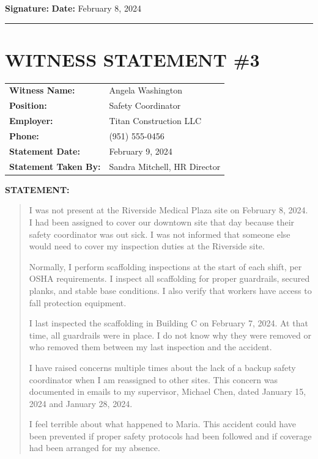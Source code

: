 \documentclass[11pt]{article}
\begin{document}
\vspace{1em}

\noindent\textbf{Signature:} \underline{\hspace{5cm}} \hfill \textbf{Date:} February 8, 2024

\vspace{3em}
\hrule
\vspace{2em}

\section*{WITNESS STATEMENT \#3}

\begin{tabular}{@{}p{4cm}p{10cm}@{}}
\textbf{Witness Name:} & Angela Washington \\
\textbf{Position:} & Safety Coordinator \\
\textbf{Employer:} & Titan Construction LLC \\
\textbf{Phone:} & (951) 555-0456 \\
\textbf{Statement Date:} & February 9, 2024 \\
\textbf{Statement Taken By:} & Sandra Mitchell, HR Director \\
\end{tabular}

\vspace{1em}

\noindent\textbf{STATEMENT:}

\begin{quote}
I was not present at the Riverside Medical Plaza site on February 8, 2024. I had been assigned to cover our downtown site that day because their safety coordinator was out sick. I was not informed that someone else would need to cover my inspection duties at the Riverside site.

Normally, I perform scaffolding inspections at the start of each shift, per OSHA requirements. I inspect all scaffolding for proper guardrails, secured planks, and stable base conditions. I also verify that workers have access to fall protection equipment.

I last inspected the scaffolding in Building C on February 7, 2024. At that time, all guardrails were in place. I do not know why they were removed or who removed them between my last inspection and the accident.

I have raised concerns multiple times about the lack of a backup safety coordinator when I am reassigned to other sites. This concern was documented in emails to my supervisor, Michael Chen, dated January 15, 2024 and January 28, 2024.

I feel terrible about what happened to Maria. This accident could have been prevented if proper safety protocols had been followed and if coverage had been arranged for my absence.
\end{quote}
\end{document}
